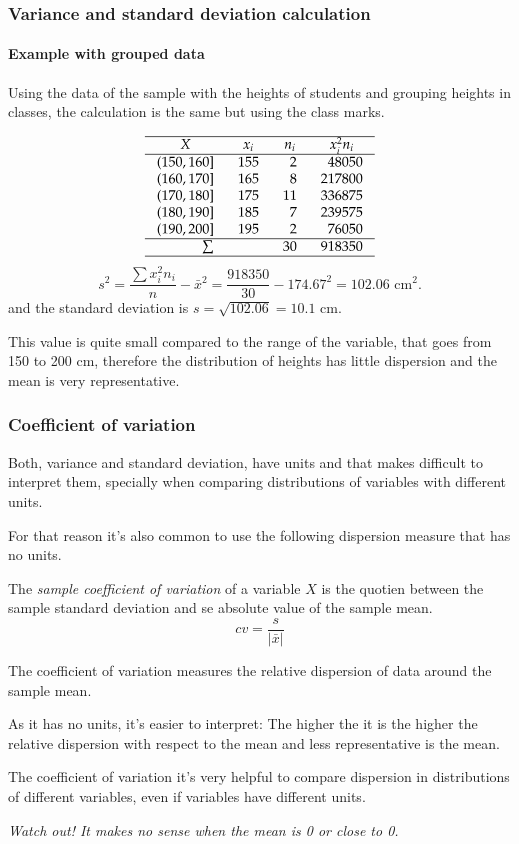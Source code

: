 \begin{frame}
\frametitle{Variance and standard deviation calculation}
\framesubtitle{Example with grouped data}
Using the data of the sample with the heights of students and grouping heights in classes, the calculation is the same
but using the class marks. 

\[
\setlength\arraycolsep{3mm}
\setlength\arrayrulewidth{0.5pt}
\begin{array}{rrrr}
\hline
\multicolumn{1}{c}{X} & \multicolumn{1}{c}{x_i} & \multicolumn{1}{c}{n_i} & \multicolumn{1}{c}{x_i^2n_i} \\
\hline
(150,160] & 155 & 2 & 48050\\
(160,170] & 165 & 8 & 217800\\
(170,180] & 175 & 11 & 336875\\
(180,190] & 185 & 7 & 239575\\
(190,200] & 195 & 2 & 76050\\
\hline
\sum &  & 30 & 918350 \\
\hline
\end{array}
\]
\[
s^2 = \frac{\sum x_i^2n_i}{n}-\bar x^2 = \frac{918350}{30}-174.67^2= 102.06 \mbox{ cm}^2.
\]
and the standard deviation is $s=\sqrt{102.06} = 10.1$ cm.

This value is quite small compared to the range of the variable, that goes from 150 to 200 cm, therefore the
distribution of heights has little dispersion and the mean is very representative.
\end{frame}


\begin{frame}
\frametitle{Coefficient of variation}
Both, variance and standard deviation, have units and that makes difficult to interpret them, specially when comparing
distributions of variables with different units.

For that reason it's also common to use the following dispersion measure that has no units.  
\begin{definition}
The \emph{sample coefficient of variation} of a variable $X$ is the quotien between the sample standard deviation and se
absolute value of the sample mean.
\[
cv = \frac{s}{|\bar x|}
\]
\end{definition}
The coefficient of variation measures the relative dispersion of data around the sample mean.  

As it has no units, it's easier to interpret: The higher the it is the higher the relative dispersion with respect to
the mean and less representative is the mean.

The coefficient of variation it's very helpful to compare dispersion in distributions of different variables, even if
variables have different units.
\begin{center}
\alert{\emph{Watch out! It makes no sense when the mean is 0 or close to 0.}}
\end{center}
\end{frame}


